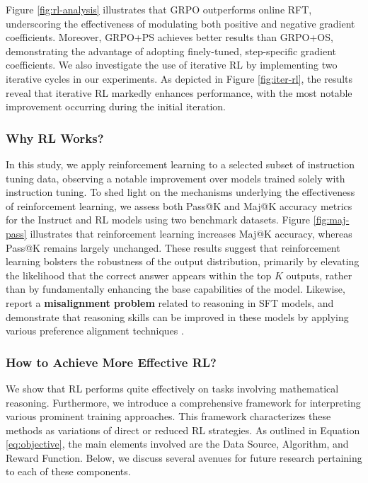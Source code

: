 \begin{itemize}[topsep=0pt]
Figure \ref{fig:rl-analysis} illustrates that GRPO outperforms online RFT, underscoring the effectiveness of modulating both positive and negative gradient coefficients. Moreover, GRPO+PS achieves better results than GRPO+OS, demonstrating the advantage of adopting finely-tuned, step-specific gradient coefficients. We also investigate the use of iterative RL by implementing two iterative cycles in our experiments. As depicted in Figure \ref{fig:iter-rl}, the results reveal that iterative RL markedly enhances performance, with the most notable improvement occurring during the initial iteration.

\subsubsection{Why RL Works?} In this study, we apply reinforcement learning to a selected subset of instruction tuning data, observing a notable improvement over models trained solely with instruction tuning. To shed light on the mechanisms underlying the effectiveness of reinforcement learning, we assess both Pass@K and Maj@K accuracy metrics for the Instruct and RL models using two benchmark datasets. Figure \ref{fig:maj-pass} illustrates that reinforcement learning increases Maj@K accuracy, whereas Pass@K remains largely unchanged. These results suggest that reinforcement learning bolsters the robustness of the output distribution, primarily by elevating the likelihood that the correct answer appears within the top $K$ outputs, rather than by fundamentally enhancing the base capabilities of the model. Likewise, \citep{wang2023making} report a \textbf{misalignment problem} related to reasoning in SFT models, and demonstrate that reasoning skills can be improved in these models by applying various preference alignment techniques \citep{yuan2023rrhf,song2023preference,wang2023making}.

\subsubsection{How to Achieve More Effective RL?}
\label{sec:effec_rl}
We show that RL performs quite effectively on tasks involving mathematical reasoning. Furthermore, we introduce a comprehensive framework for interpreting various prominent training approaches. This framework characterizes these methods as variations of direct or reduced RL strategies. As outlined in Equation \ref{eq:objective}, the main elements involved are the Data Source, Algorithm, and Reward Function. Below, we discuss several avenues for future research pertaining to each of these components.


\end{itemize}
